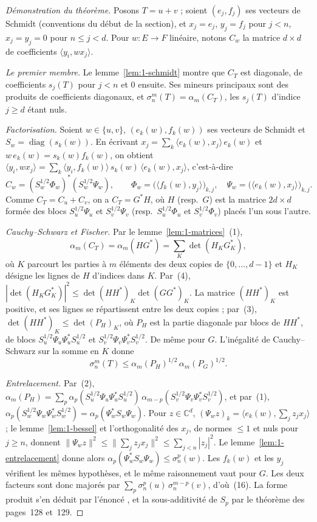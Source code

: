 \begin{proof}[Démonstration du théorème]
Posons $T = u + v$ ; soient $(e_j, f_j)$ ses vecteurs de Schmidt (conventions du début de la section), et $x_j = e_j$, $y_j = f_j$ pour $j < n$, $x_j = y_j = 0$ pour $n \leq j < d$. Pour $w : E \to F$ linéaire, notons $C_w$ la matrice $d \times d$ de coefficients $\langle y_i, w x_j\rangle$.

\emph{Le premier membre.} Le lemme~\ref{lem:1-schmidt} montre que $C_T$ est diagonale, de coefficients $s_j(T)$ pour $j < n$ et $0$ ensuite. Ses mineurs principaux sont des produits de coefficients diagonaux, et $\sigma_n^m(T) = \alpha_m(C_T)$, les $s_j(T)$ d'indice $j \geq d$ étant nuls.

\emph{Factorisation.} Soient $w \in \{u, v\}$, $(e_k(w), f_k(w))$ ses vecteurs de Schmidt et $S_w = \operatorname{diag}(s_k(w))$. En écrivant $x_j = \sum_k \langle e_k(w), x_j\rangle\, e_k(w)$ et $w\,e_k(w) = s_k(w) f_k(w)$, on obtient $\langle y_i, w x_j\rangle = \sum_k \langle y_i, f_k(w)\rangle\, s_k(w)\, \langle e_k(w), x_j\rangle$, c'est-à-dire
\[
  C_w = (S_w^{1/2} \Phi_w)^* (S_w^{1/2} \Psi_w), \qquad \Phi_w = \bigl(\langle f_k(w), y_j\rangle\bigr)_{k,j}, \quad \Psi_w = \bigl(\langle e_k(w), x_j\rangle\bigr)_{k,j}.
\]
Comme $C_T = C_u + C_v$, on a $C_T = G^* H$, où $H$ (resp.\ $G$) est la matrice $2d \times d$ formée des blocs $S_u^{1/2}\Psi_u$ et $S_v^{1/2}\Psi_v$ (resp.\ $S_u^{1/2}\Phi_u$ et $S_v^{1/2}\Phi_v$) placés l'un sous l'autre.

\emph{Cauchy--Schwarz et Fischer.} Par le lemme~\ref{lem:1-matrices}~(1),
\[ \alpha_m(C_T) = \alpha_m(HG^*) = \sum_K \det(H_K G_K^*), \]
où $K$ parcourt les parties à $m$ éléments des deux copies de $\{0, \ldots, d-1\}$ et $H_K$ désigne les lignes de $H$ d'indices dans $K$. Par~(4), $|\det(H_K G_K^*)|^2 \leq \det(HH^*)_K \det(GG^*)_K$. La matrice $(HH^*)_K$ est positive, et ses lignes se répartissent entre les deux copies ; par~(3), $\det(HH^*)_K \leq \det(P_H)_K$, où $P_H$ est la partie diagonale par blocs de $HH^*$, de blocs $S_u^{1/2}\Psi_u\Psi_u^*S_u^{1/2}$ et $S_v^{1/2}\Psi_v\Psi_v^*S_v^{1/2}$. De même pour $G$. L'inégalité de Cauchy--Schwarz sur la somme en $K$ donne
\[
  \sigma_n^m(T) \leq \alpha_m(P_H)^{1/2}\, \alpha_m(P_G)^{1/2}.
\]

\emph{Entrelacement.} Par~(2), $\alpha_m(P_H) = \sum_p \alpha_p(S_u^{1/2}\Psi_u\Psi_u^*S_u^{1/2})\, \alpha_{m-p}(S_v^{1/2}\Psi_v\Psi_v^*S_v^{1/2})$, et par~(1), $\alpha_p(S_w^{1/2}\Psi_w\Psi_w^*S_w^{1/2}) = \alpha_p(\Psi_w^* S_w \Psi_w)$. Pour $z \in \mathbb C^d$, $(\Psi_w z)_k = \langle e_k(w), \sum_j z_j x_j\rangle$ ; le lemme~\ref{lem:1-bessel} et l'orthogonalité des $x_j$, de normes $\leq 1$ et nuls pour $j \geq n$, donnent $\|\Psi_w z\|^2 \leq \|\sum_j z_j x_j\|^2 \leq \sum_{j<n} |z_j|^2$. Le lemme~\ref{lem:1-entrelacement} donne alors $\alpha_p(\Psi_w^* S_w \Psi_w) \leq \sigma_n^p(w)$. Les $f_k(w)$ et les $y_j$ vérifient les mêmes hypothèses, et le même raisonnement vaut pour $G$. Les deux facteurs sont donc majorés par $\sum_p \sigma_n^p(u)\,\sigma_n^{m-p}(v)$, d'où~(16). La forme produit s'en déduit par l'énoncé , et la sous-additivité de $S_p$ par le théorème des pages~128 et~129.
\end{proof}

